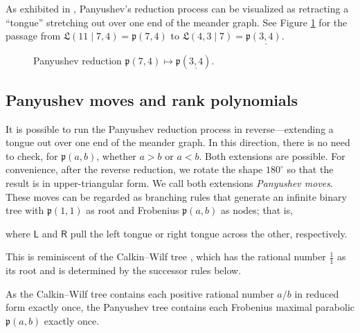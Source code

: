 \documentclass{amsart}
\newcommand{\demph}[1]{\textcolor{myblue}{\emph{#1}}}
\renewcommand{\demph}[1]{\emph{#1}}
\def\fp{\mathfrak p} %
\def\L{\mathfrak L}
\newcommand{\pab}[1][a,b]{\fp(#1)}
\newcommand{\puab}[1][a,b]{\fp\underline{(#1)}}
\def\pL{\mathsf L}
\def\pR{\mathsf R}
\theoremstyle{definition}
\begin{document}
As exhibited in \cite{coll2015meander}, Panyushev's reduction process can be visualized as retracting a ``tongue'' stretching out over one end of the meander graph. See Figure \ref{fig:panyushev-reduction} for the passage from $\L(11\mid 7,4)=\pab[7,4]$ to $\L(4,3\mid 7)=\puab[3,4]$. %
\begin{figure}[!htb]
\centering
    
\caption{Panyushev reduction $\pab[7,4] \mapsto \pab[\underline{3,4}]$.}\label{fig:panyushev-reduction}
\end{figure}

\subsection{Panyushev moves and rank polynomials}
\label{sec:panyushev_rank}
It is possible to run the Panyushev reduction process in reverse---{extending} a tongue out over one end of the meander graph. In this direction, there is no need to check, for $\pab$, whether $a>b$ or $a<b$. Both extensions are possible. For convenience, after the reverse reduction, we rotate the shape $180^\circ$ so that the result is in upper-triangular form. We call both extensions \demph{Panyushev moves}. These moves can be regarded as branching rules that generate an infinite binary tree with $\pab[1,1]$ as root and Frobenius $\pab$ as nodes; that is, 
\begin{center}
\end{center}
where  $\pL$ and $\pR$ pull the left tongue or right tongue across the other, respectively.

This is reminiscent of the Calkin--Wilf tree \cite{calkin2000recounting,berstel1997sturmian}, which has the rational number $\frac{1}{1}$ as its root and is determined by the successor rules below.
\begin{center}
\end{center}
As the Calkin--Wilf tree contains each positive rational number $a/b$ in reduced form exactly once, the Panyushev tree contains each Frobenius maximal parabolic $\pab$ exactly once.
\end{document}
